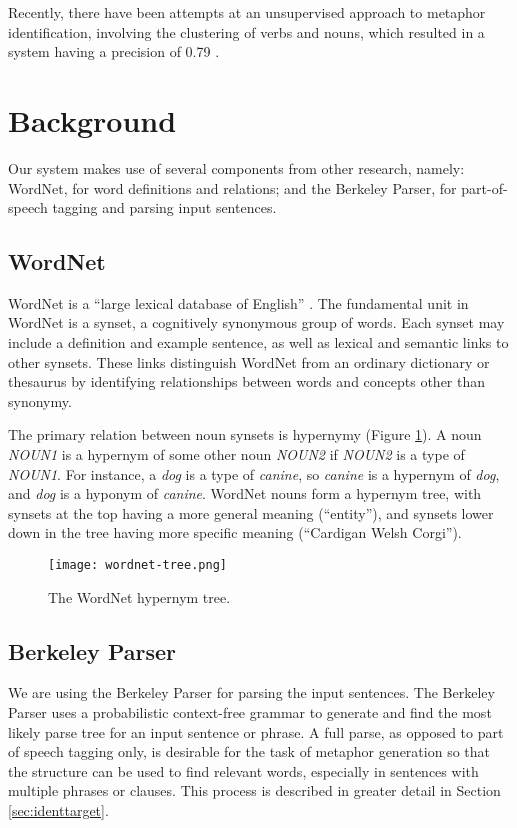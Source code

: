 \documentclass[12pt]{article}
\begin{document}
Recently, there have been attempts at an unsupervised approach to metaphor identification, involving the clustering of verbs and nouns, which resulted in a system having a precision of 0.79 \cite{shutova101}.

\section{Background}

Our system makes use of several components from other research, namely: WordNet, for word definitions and relations; and the Berkeley Parser, for part-of-speech tagging and parsing input sentences.

\subsection{WordNet}

WordNet is a ``large lexical database of English'' \cite{wordnet}. The fundamental unit in WordNet is a synset, a cognitively synonymous group of words. Each synset may include a definition and example sentence, as well as lexical and semantic links to other synsets. These links distinguish WordNet from an ordinary dictionary or thesaurus by identifying relationships between words and concepts other than synonymy.

The primary relation between noun synsets is hypernymy (Figure \ref{fig:wordnettree}). A noun \emph{NOUN1} is a hypernym of some other noun \emph{NOUN2} if \emph{NOUN2} is a type of \emph{NOUN1}. For instance, a \emph{dog} is a type of \emph{canine}, so \emph{canine} is a hypernym of \emph{dog}, and \emph{dog} is a hyponym of \emph{canine}. WordNet nouns form a hypernym tree, with synsets at the top having a more general meaning (``entity''), and synsets lower down in the tree having more specific meaning (``Cardigan Welsh Corgi'').

\begin{figure}[h]
	\centering
	\texttt{[image: wordnet-tree.png]}
	\caption{The WordNet hypernym tree.}
	\label{fig:wordnettree}
\end{figure}

\subsection{Berkeley Parser}
\label{sec:berkeleyparser}

We are using the Berkeley Parser \cite{berkeleyparser} for parsing the input sentences.  The Berkeley Parser uses a probabilistic context-free grammar to generate and find the most likely parse tree for an input sentence or phrase.  A full parse, as opposed to part of speech tagging only, is desirable for the task of metaphor generation so that the structure can be used to find relevant words, especially in sentences with multiple phrases or clauses.  This process is described in greater detail in Section \ref{sec:identtarget}.
\end{document}
